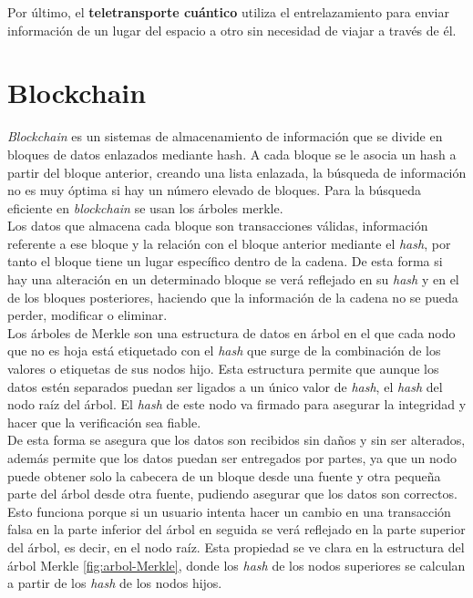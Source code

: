 Por último, el \textbf{teletransporte cuántico} utiliza el entrelazamiento para enviar información de un lugar del espacio a otro sin necesidad de viajar a través de él.\\




\section{Blockchain}\label{sec:intro:blockchain}


\textit{Blockchain} es un sistemas de almacenamiento de información que se divide en bloques de datos enlazados mediante hash. A cada bloque se le asocia un hash a partir del bloque anterior, creando una lista enlazada, la búsqueda de información no es muy óptima si hay un número elevado de bloques. Para la búsqueda eficiente en \textit{blockchain} se usan los árboles merkle.\\

Los datos que almacena cada bloque son transacciones válidas, información referente a ese bloque y la relación con el bloque anterior mediante el \textit{hash}, por tanto el bloque tiene un lugar específico dentro de la cadena. De esta forma si hay una alteración en un determinado bloque se verá reflejado en su \textit{hash} y en el de los bloques posteriores, haciendo que la información de la cadena no se pueda perder, modificar o eliminar.\\


Los árboles de Merkle \cite{arbol-merkle} son una estructura de datos en árbol en el que cada nodo que no es hoja está etiquetado con el \textit{hash} que surge de la combinación de los valores o etiquetas de sus nodos hijo. Esta estructura permite que aunque los datos estén separados puedan ser ligados a un único valor de \textit{hash}, el \textit{hash} del nodo raíz del árbol. El \textit{hash} de este nodo va firmado para asegurar la integridad y hacer que la verificación sea fiable.\\

De esta forma se asegura que los datos son recibidos sin daños y sin ser alterados, además permite que los datos puedan ser entregados por partes, ya que un nodo puede obtener solo la cabecera de un bloque desde una fuente y otra pequeña parte del árbol desde otra fuente, pudiendo asegurar que los datos son correctos. Esto funciona porque si un usuario intenta hacer un cambio en una transacción falsa en la parte inferior del árbol en seguida se verá reflejado en la parte superior del árbol, es decir, en el nodo raíz. Esta propiedad se ve clara en la estructura del árbol Merkle \ref{fig:arbol-Merkle}, donde los \textit{hash} de los nodos superiores se calculan a partir de los \textit{hash} de los nodos hijos.\\

